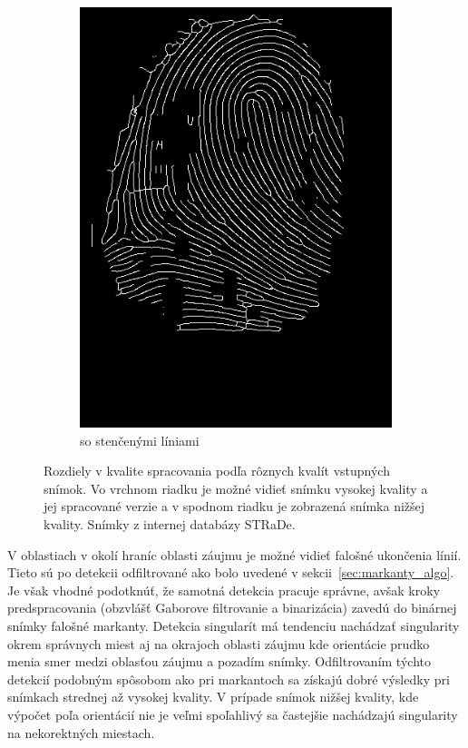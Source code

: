 \begin{figure}[h]
\begin{subfigure}[b]{0.3\linewidth}
      \includegraphics[width=\linewidth]{obrazky-figures/ecsema_thin.png}
      \caption{so stenčenými líniami}
    \end{subfigure}
    \caption{Rozdiely v kvalite spracovania podľa rôznych kvalít vstupných snímok. Vo vrchnom riadku je možné vidieť snímku vysokej kvality a jej spracované
    verzie a v spodnom riadku je zobrazená snímka nižšej kvality. Snímky z internej databázy STRaDe.}
    \label{obr:porovnanie_kvality}
  \end{figure}

  V oblastiach v okolí hraníc oblasti záujmu je možné vidieť falošné ukončenia línií. Tieto sú po detekcii odfiltrované ako bolo uvedené v
  sekcii~{\ref{sec:markanty_algo}}. Je však vhodné podotknúť, že samotná detekcia pracuje správne, avšak kroky
  predspracovania (obzvlášť Gaborove filtrovanie a binarizácia) zavedú do binárnej snímky falošné markanty.
  Detekcia singularít má tendenciu nachádzať singularity okrem správnych miest aj na okrajoch oblasti záujmu kde orientácie prudko menia smer medzi
  oblasťou záujmu a pozadím snímky. Odfiltrovaním týchto detekcií podobným spôsobom ako pri markantoch sa získajú dobré výsledky pri snímkach strednej až
  vysokej kvality.
  V prípade snímok nižšej kvality, kde výpočet poľa orientácií nie je veľmi spoľahlivý sa častejšie nachádzajú singularity na nekorektných miestach.


